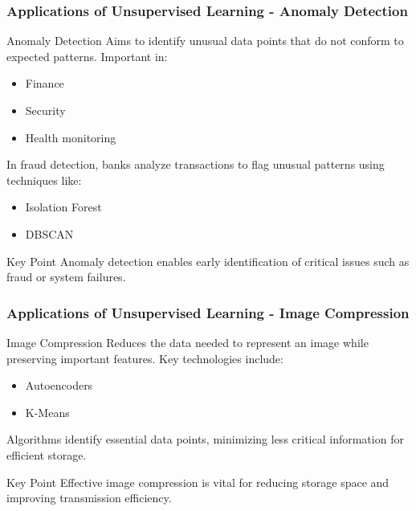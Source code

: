 \documentclass[aspectratio=169]{beamer}
\begin{document}
\begin{frame}[fragile]
    \frametitle{Applications of Unsupervised Learning - Anomaly Detection}
    \begin{block}{Anomaly Detection}
        Aims to identify unusual data points that do not conform to expected patterns. Important in:
        \begin{itemize}
            \item Finance
            \item Security
            \item Health monitoring
        \end{itemize}
    \end{block}
    \begin{example}
        In fraud detection, banks analyze transactions to flag unusual patterns using techniques like:
        \begin{itemize}
            \item Isolation Forest
            \item DBSCAN
        \end{itemize}
    \end{example}
    \begin{block}{Key Point}
        Anomaly detection enables early identification of critical issues such as fraud or system failures.
    \end{block}
\end{frame}

\begin{frame}[fragile]
    \frametitle{Applications of Unsupervised Learning - Image Compression}
    \begin{block}{Image Compression}
        Reduces the data needed to represent an image while preserving important features. Key technologies include:
        \begin{itemize}
            \item Autoencoders
            \item K-Means
        \end{itemize}
    \end{block}
    \begin{example}
        Algorithms identify essential data points, minimizing less critical information for efficient storage.
    \end{example}
    \begin{block}{Key Point}
        Effective image compression is vital for reducing storage space and improving transmission efficiency.
    \end{block}
\end{frame}
\end{document}
